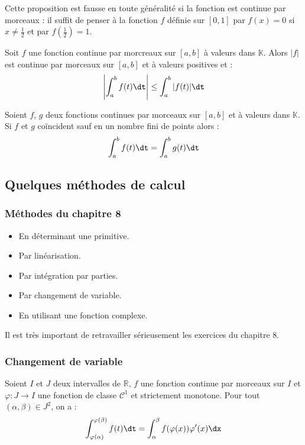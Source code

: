 \documentclass[a4paper,10pt]{report}
\begin{document}
\begin{att} Cette proposition est fausse en toute généralité si la fonction est continue par morceaux : il suffit de penser à la fonction $f$ définie sur $[0,1]$ par $f(x)=0$ si $x \neq \frac{1}{2}$ et par $f(\frac{1}{2})=1$.
\end{att}

\begin{prop} Soit $f$ une fonction continue par morcreaux sur $[a,b]$ à valeurs dans $\mathbb{K}$. Alors $\vert f \vert$ est continue par morceaux   sur $[a,b]$ et à valeurs positives et :
$$ \left\vert \int_{a}^b f(t) \dt \right\vert \leq \int_{a}^b \vert f(t) \vert \dt $$
\end{prop}

\begin{prop} Soient $f$, $g$ deux fonctions continues par morceaux sur $[a,b]$ et à valeurs dans $\mathbb{K}$. Si $f$ et $g$ coïncident sauf en un nombre fini de points alors :
$$ \int_{a}^b f(t) \dt = \int_{a}^b g(t) \dt $$
\end{prop}

\subsection{Quelques méthodes de calcul}
\subsubsection{Méthodes du chapitre 8}

\begin{itemize}
\item En déterminant une primitive.
\item Par linéarisation.
\item Par intégration par parties.
\item Par changement de variable.
\item En utilisant une fonction complexe.
\end{itemize}

\medskip

\noindent Il est très important de retravailler sérieusement les exercices du chapitre 8. 

\subsubsection{Changement de variable}

\begin{prop} Soient $I$ et $J$ deux intervalles de $\mathbb{R}$, $f$ une fonction continue par morceaux sur $I$ et $\varphi : J \rightarrow I$ une fonction de classe $\mathcal{C}^1$ et strictement monotone. Pour tout $(\alpha, \beta) \in J^2$, on a :
$$ \int_{\varphi(\alpha)}^{\varphi(\beta)} f(t) \dt = \int_{\alpha}^{\beta} f( \varphi(x)) \varphi'(x) \dx$$
\end{prop}
\end{document}
